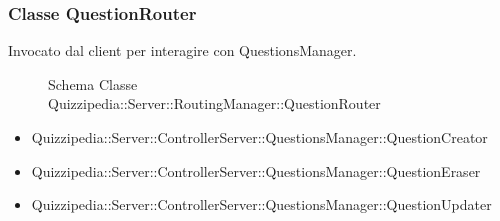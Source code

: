 \subsubsection{Classe QuestionRouter}
Invocato dal client per interagire con QuestionsManager.
\begin{figure}[H]
\centering
\noindent{}
\caption[Schema Classe QuestionRouter]{Schema Classe Quizzipedia::Server::RoutingManager::QuestionRouter}
\end{figure}
\begin{itemize}
\item Quizzipedia::Server::ControllerServer::QuestionsManager::QuestionCreator
\item Quizzipedia::Server::ControllerServer::QuestionsManager::QuestionEraser
\item Quizzipedia::Server::ControllerServer::QuestionsManager::QuestionUpdater
\end{itemize}
